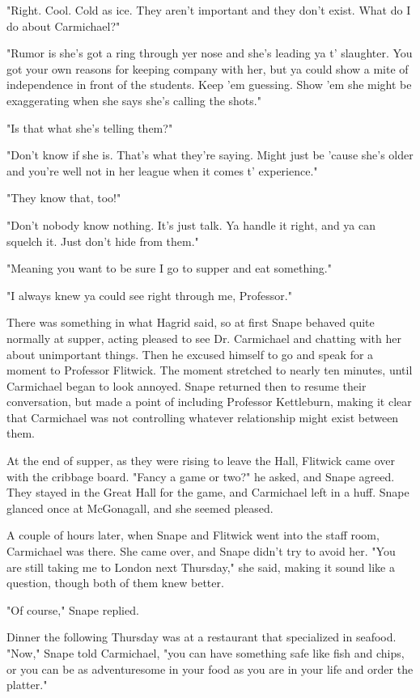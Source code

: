 "Right. Cool. Cold as ice. They aren't important and they don't exist. What do I do about Carmichael?"

"Rumor is she's got a ring through yer nose and she's leading ya t' slaughter. You got your own reasons for keeping company with her, but ya could show a mite of independence in front of the students. Keep 'em guessing. Show 'em she might be exaggerating when she says she's calling the shots."

"Is that what she's telling them?"

"Don't know if she is. That's what they're saying. Might just be 'cause she's older and you're{\el} well{\el} not in her league when it comes t' experience."

"They know that, too!"

"Don't nobody know nothing. It's just talk. Ya handle it right, and ya can squelch it. Just don't hide from them."

"Meaning you want to be sure I go to supper and eat something."

"I always knew ya could see right through me, Professor."

There was something in what Hagrid said, so at first Snape behaved quite normally at supper, acting pleased to see Dr. Carmichael and chatting with her about unimportant things. Then he excused himself to go and speak for a moment to Professor Flitwick. The moment stretched to nearly ten minutes, until Carmichael began to look annoyed. Snape returned then to resume their conversation, but made a point of including Professor Kettleburn, making it clear that Carmichael was not controlling whatever relationship might exist between them.

At the end of supper, as they were rising to leave the Hall, Flitwick came over with the cribbage board. "Fancy a game or two?" he asked, and Snape agreed. They stayed in the Great Hall for the game, and Carmichael left in a huff. Snape glanced once at McGonagall, and she seemed pleased.

A couple of hours later, when Snape and Flitwick went into the staff room, Carmichael was there. She came over, and Snape didn't try to avoid her. "You are still taking me to London next Thursday," she said, making it sound like a question, though both of them knew better.

"Of course," Snape replied.

Dinner the following Thursday was at a restaurant that specialized in seafood. "Now," Snape told Carmichael, "you can have something safe like fish and chips, or you can be as adventuresome in your food as you are in your life and order the platter."

